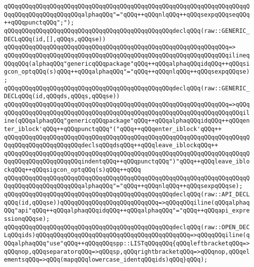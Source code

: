 \verb|qQQqqQQqqQQqqQQqqQQqqQQqqQQqqQQqqQQqqQQqqQQqqQQqqQQqqQQqqQQqqQQqqQQqqQQqqQQqqQQqqQQqqQQqqQQqalphaqQQq"="qQQq++qQQqnlqQQq++qQQqsexpqQQqseqQQq++qQQqpunctqQQq";");|\newline
\newline
\verb|qQQqqQQqqQQqqQQqqQQqqQQqqQQqqQQqqQQqqQQqqQQqqQQqdeclqQQq(raw::GENERIC_DECLqQQq(id,[],qQQqs,qQQqse))|\newline
\verb|qQQqqQQqqQQqqQQqqQQqqQQqqQQqqQQqqQQqqQQqqQQqqQQqqQQqqQQqqQQqqQQq=>|\newline
\verb|qQQqqQQqqQQqqQQqqQQqqQQqqQQqqQQqqQQqqQQqqQQqqQQqqQQqqQQqqQQqqQQqilineqQQqqQQq(alphaqQQq"genericqQQqpackage"qQQq++qQQqalphaqQQqidqQQq++qQQqsigcon_optqQQq(s)qQQq++qQQqalphaqQQq"="qQQq++qQQqnlqQQq++qQQqsexpqQQqse);|\newline
\newline
\verb|qQQqqQQqqQQqqQQqqQQqqQQqqQQqqQQqqQQqqQQqqQQqqQQqdeclqQQq(raw::GENERIC_DECLqQQq(id,qQQqds,qQQqs,qQQqse))|\newline
\verb|qQQqqQQqqQQqqQQqqQQqqQQqqQQqqQQqqQQqqQQqqQQqqQQqqQQqqQQqqQQqqQQq=>qQQq|\newline
\verb|qQQqqQQqqQQqqQQqqQQqqQQqqQQqqQQqqQQqqQQqqQQqqQQqqQQqqQQqqQQqqQQqqQQqiline(qQQqalphaqQQq"genericqQQqpackage"qQQq++qQQqalphaqQQqidqQQq++qQQqenter_iblock'qQQq++qQQqpunctqQQq"("qQQq++qQQqenter_iblock'qQQq++|\newline
\verb|qQQqqQQqqQQqqQQqqQQqqQQqqQQqqQQqqQQqqQQqqQQqqQQqqQQqqQQqqQQqqQQqqQQqqQQqqQQqqQQqqQQqqQQqqQQqdeclsqQQqdsqQQq++qQQqleave_iblockqQQq++|\newline
\verb|qQQqqQQqqQQqqQQqqQQqqQQqqQQqqQQqqQQqqQQqqQQqqQQqqQQqqQQqqQQqqQQqqQQqqQQqqQQqqQQqqQQqqQQqqQQqindentqQQq++qQQqpunctqQQq")"qQQq++qQQqleave_iblockqQQq++qQQqsigcon_optqQQq(s)qQQq++qQQq|\newline
\verb|qQQqqQQqqQQqqQQqqQQqqQQqqQQqqQQqqQQqqQQqqQQqqQQqqQQqqQQqqQQqqQQqqQQqqQQqqQQqqQQqqQQqqQQqqQQqalphaqQQq"="qQQq++qQQqnlqQQq++qQQqsexpqQQqse);|\newline
\newline
\verb|qQQqqQQqqQQqqQQqqQQqqQQqqQQqqQQqqQQqqQQqqQQqqQQqdeclqQQq(raw::API_DECLqQQq(id,qQQqse))qQQqqQQqqQQqqQQqqQQqqQQqqQQq=>qQQqqQQqiline(qQQqalphaqQQq"api"qQQq++qQQqalphaqQQqidqQQq++qQQqalphaqQQq"="qQQq++qQQqapi_expressionqQQqse);|\newline
\verb|qQQqqQQqqQQqqQQqqQQqqQQqqQQqqQQqqQQqqQQqqQQqqQQqdeclqQQq(raw::OPEN_DECLqQQqids)qQQqqQQqqQQqqQQqqQQqqQQqqQQqqQQqqQQqqQQqqQQq=>qQQqqQQqiline(qQQqalphaqQQq"use"qQQq++qQQqqQQqspp::LISTqQQqqQQq{qQQqleftbracketqQQq=>qQQqnop,qQQqseparatorqQQq=>qQQqsp,qQQqrightbracketqQQq=>qQQqnop,qQQqelementsqQQq=>qQQq(mapqQQqlowercase_identqQQqids)qQQq}qQQq);|\newline

